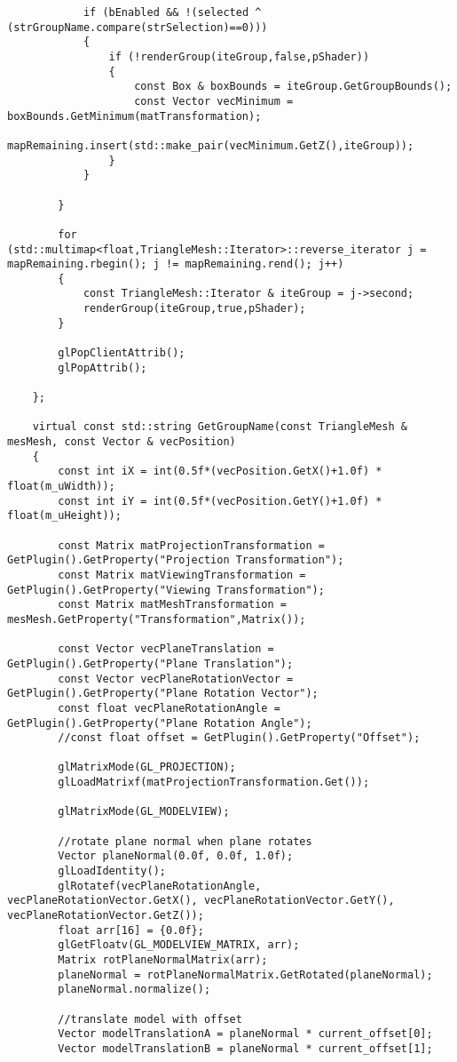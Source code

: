 \begin{verbatim}
			if (bEnabled && !(selected ^ (strGroupName.compare(strSelection)==0)))
			{
				if (!renderGroup(iteGroup,false,pShader))
				{
					const Box & boxBounds = iteGroup.GetGroupBounds();
					const Vector vecMinimum = boxBounds.GetMinimum(matTransformation);
					mapRemaining.insert(std::make_pair(vecMinimum.GetZ(),iteGroup));
				}
			}

		}

		for (std::multimap<float,TriangleMesh::Iterator>::reverse_iterator j = mapRemaining.rbegin(); j != mapRemaining.rend(); j++)
		{
			const TriangleMesh::Iterator & iteGroup = j->second;
			renderGroup(iteGroup,true,pShader);
		}

		glPopClientAttrib();
		glPopAttrib();

	};

	virtual const std::string GetGroupName(const TriangleMesh & mesMesh, const Vector & vecPosition)
	{
		const int iX = int(0.5f*(vecPosition.GetX()+1.0f) * float(m_uWidth));
		const int iY = int(0.5f*(vecPosition.GetY()+1.0f) * float(m_uHeight));

		const Matrix matProjectionTransformation = GetPlugin().GetProperty("Projection Transformation");
		const Matrix matViewingTransformation = GetPlugin().GetProperty("Viewing Transformation");
		const Matrix matMeshTransformation = mesMesh.GetProperty("Transformation",Matrix());

		const Vector vecPlaneTranslation = GetPlugin().GetProperty("Plane Translation");
		const Vector vecPlaneRotationVector = GetPlugin().GetProperty("Plane Rotation Vector");
		const float vecPlaneRotationAngle = GetPlugin().GetProperty("Plane Rotation Angle");
		//const float offset = GetPlugin().GetProperty("Offset");

		glMatrixMode(GL_PROJECTION);
		glLoadMatrixf(matProjectionTransformation.Get());

		glMatrixMode(GL_MODELVIEW);

		//rotate plane normal when plane rotates
		Vector planeNormal(0.0f, 0.0f, 1.0f);
		glLoadIdentity();
		glRotatef(vecPlaneRotationAngle, vecPlaneRotationVector.GetX(), vecPlaneRotationVector.GetY(), vecPlaneRotationVector.GetZ());
		float arr[16] = {0.0f};
		glGetFloatv(GL_MODELVIEW_MATRIX, arr);
		Matrix rotPlaneNormalMatrix(arr);
		planeNormal = rotPlaneNormalMatrix.GetRotated(planeNormal);
		planeNormal.normalize();

		//translate model with offset
		Vector modelTranslationA = planeNormal * current_offset[0];
		Vector modelTranslationB = planeNormal * current_offset[1];



\end{verbatim}
